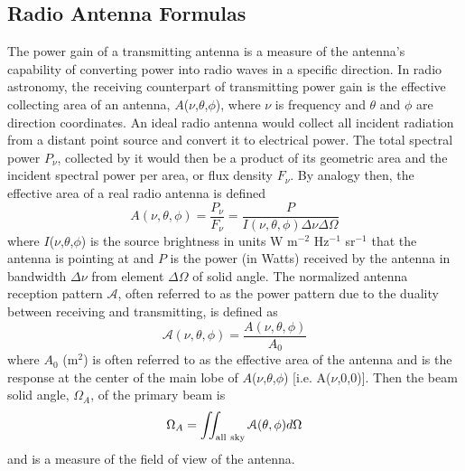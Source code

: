 \subsection{Radio Antenna Formulas}\label{subsec:1}
The power gain of a transmitting antenna is a measure of the antenna's capability of converting power into radio waves in a specific direction. In radio astronomy, the receiving counterpart of transmitting power gain is the effective collecting area of an antenna, $A$($\nu$,$\theta$,$\phi$), where $\nu$ is frequency and $\theta$ and $\phi$ are direction coordinates. An ideal radio antenna would collect all incident radiation from a distant point source and convert it to electrical power. The total spectral power $P_{\nu}$, collected by it would then be a product of its geometric area and the incident spectral power per area, or flux density $F_{\nu}$. By analogy then, the effective area of a real radio antenna is defined
\begin{equation}
A(\nu,\theta,\phi)= \frac{P_{\nu}}{F_{\nu}}=\frac{P}{I(\nu,\theta,\phi)\Delta \nu \Delta \Omega}
\end{equation}
where $I$($\nu$,$\theta$,$\phi$) is the source brightness in units W m$^{-2}$ Hz$^{-1}$ sr$^{-1}$ that the antenna is pointing at and $P$ is the power (in Watts) received by the antenna in bandwidth $\Delta \nu$ from element $\Delta\Omega$ of solid angle. The normalized antenna reception pattern $\mathcal{A}$, often referred to as the power pattern due to the duality between receiving and transmitting, is defined as 
\begin{equation}
\mathcal{A}(\nu,\theta,\phi)= \frac{A(\nu,\theta,\phi)}{A_{0}}
\end{equation}
where $A_0$ (m$^2$) is often referred to as the effective area of the antenna and is the response at the center of the main lobe of $A$($\nu$,$\theta$,$\phi$) [i.e. A($\nu$,0,0)]. Then the beam solid angle, $\Omega _{A}$, of the primary beam is 
\begin{equation}
\Omega _{A} = \int \!\!\! \int _{\rm{all\ sky}} \mathcal{A}(\theta,\phi) d \Omega
\end{equation}
and is a measure of the field of view of the antenna. 

